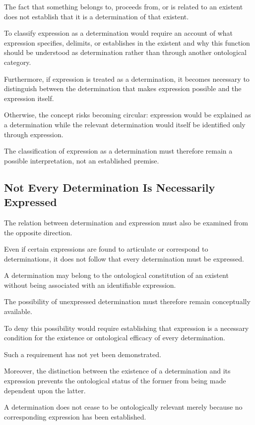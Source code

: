The fact that something belongs to, proceeds from,
or is related to an existent does not establish
that it is a determination of that existent.

To classify expression as a determination would
require an account of what expression specifies,
delimits, or establishes in the existent and
why this function should be understood as
determination rather than through another
ontological category.

Furthermore, if expression is treated as a determination,
it becomes necessary to distinguish between the
determination that makes expression possible and
the expression itself.

Otherwise, the concept risks becoming circular:
expression would be explained as a determination
while the relevant determination would itself
be identified only through expression.

The classification of expression as a determination
must therefore remain a possible interpretation,
not an established premise.

\subsection{Not Every Determination Is Necessarily Expressed}

The relation between determination and expression
must also be examined from the opposite direction.

Even if certain expressions are found to articulate
or correspond to determinations, it does not follow
that every determination must be expressed.

A determination may belong to the ontological
constitution of an existent without being associated
with an identifiable expression.

The possibility of unexpressed determination
must therefore remain conceptually available.

To deny this possibility would require establishing
that expression is a necessary condition for the
existence or ontological efficacy of every
determination.

Such a requirement has not yet been demonstrated.

Moreover, the distinction between the existence
of a determination and its expression prevents
the ontological status of the former from being
made dependent upon the latter.

A determination does not cease to be ontologically
relevant merely because no corresponding expression
has been established.

